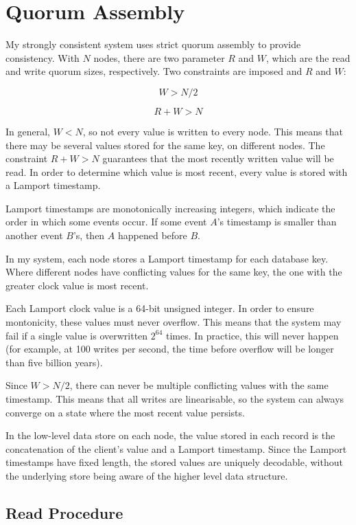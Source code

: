 \documentclass[12pt,a4paper,twoside,openany]{report}
\begin{document}
\section{Quorum Assembly}

My strongly consistent system uses strict quorum assembly to provide consistency. With $N$ nodes, there are two parameter $R$ and $W$, which are the read and write quorum sizes, respectively. Two constraints are imposed and $R$ and $W$:

$$W > N / 2$$

$$R + W > N$$

In general, $W < N$, so not every value is written to every node. This means that there may be several values stored for the same key, on different nodes. The constraint $R + W > N$ guarantees that the most recently written value will be read. In order to determine which value is most recent, every value is stored with a Lamport timestamp.

Lamport timestamps are monotonically increasing integers, which indicate the order in which some events occur. If some event $A$'s timestamp is smaller than another event $B$'s, then $A$ happened before $B$.

In my system, each node stores a Lamport timestamp for each database key. Where different nodes have conflicting values for the same key, the one with the greater clock value is most recent.

Each Lamport clock value is a 64-bit unsigned integer. In order to ensure montonicity, these values must never overflow. This means that the system may fail if a single value is overwritten $2^64$ times. In practice, this will never happen (for example, at 100 writes per second, the time before overflow will be longer than five billion years).

Since $W > N / 2$, there can never be multiple conflicting values with the same timestamp. This means that all writes are linearisable, so the system can always converge on a state where the most recent value persists.

In the low-level data store on each node, the value stored in each record is the concatenation of the client's value and a Lamport timestamp. Since the Lamport timestamps have fixed length, the stored values are uniquely decodable, without the underlying store being aware of the higher level data structure.

\subsection{Read Procedure}
\end{document}
